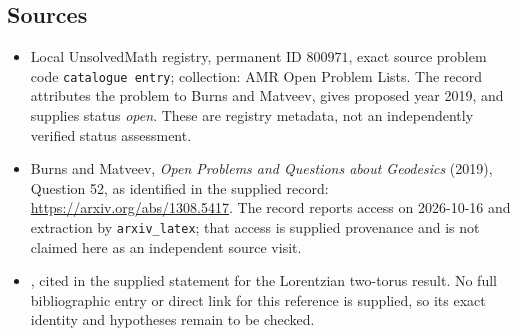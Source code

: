 \documentclass[11pt]{article}
\begin{document}
\subsection{Sources}
\begin{itemize}
\item Local UnsolvedMath registry, permanent ID \(800971\), exact source problem code \texttt{catalogue entry}; collection: AMR Open Problem Lists. The record attributes the problem to Burns and Matveev, gives proposed year 2019, and supplies status \emph{open}. These are registry metadata, not an independently verified status assessment.
\item Burns and Matveev, \emph{Open Problems and Questions about Geodesics} (2019), Question 52, as identified in the supplied record: \url{https://arxiv.org/abs/1308.5417}. The record reports access on 2026-10-16 and extraction by \texttt{arxiv\_latex}; that access is supplied provenance and is not claimed here as an independent source visit.
\item [Suhr2013a], cited in the supplied statement for the Lorentzian two-torus result. No full bibliographic entry or direct link for this reference is supplied, so its exact identity and hypotheses remain to be checked.
\end{itemize}
\end{document}
